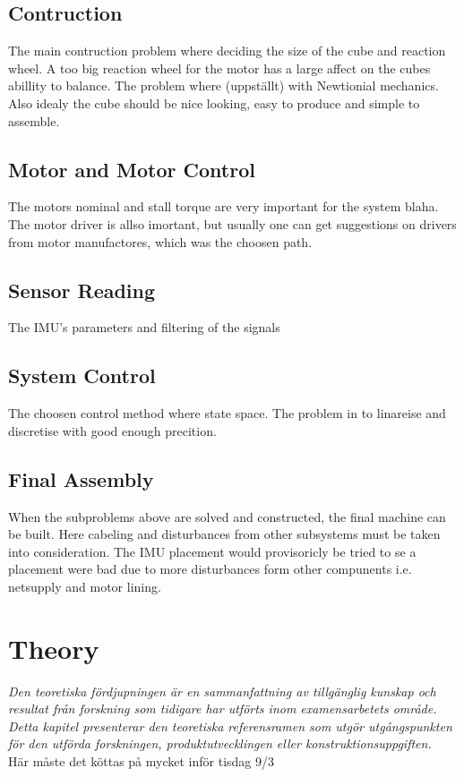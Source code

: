 \documentclass[a4paper,11pt]{kth-mag}
\begin{document}
\section{Contruction}
The main contruction problem where deciding the size of the cube and reaction wheel. A too big reaction wheel for the motor has a large affect on the cubes abillity to balance. The problem where (uppställt) with Newtionial mechanics.
Also idealy the cube should be nice looking, easy to produce and simple to assemble. 
 
\section{Motor and Motor Control}
The motors nominal and stall torque are very important for the system blaha. The motor driver is allso imortant, but usually one can get suggestions on drivers from motor manufactores, which was the choosen path.
  
\section{Sensor Reading}
The IMU's parameters and filtering of the signals

\section{System Control}
The choosen control method where state space. The problem in to linareise and discretise with good enough precition.

\section{Final Assembly}
When the subproblems above are solved and constructed, the final machine can be built. Here cabeling and disturbances from other subsystems must be taken into consideration. 
The IMU placement would provisoricly be tried to se a placement were bad due to more disturbances form other compunents i.e. netsupply and motor lining.

\chapter{Theory}
\emph{Den teoretiska fördjupningen är en sammanfattning av tillgänglig kunskap och resultat från forskning som tidigare har utförts inom examensarbetets område. Detta kapitel presenterar den teoretiska referensramen som utgör utgångspunkten för den utförda forskningen, produktutvecklingen eller konstruktionsuppgiften.}
\\ Här måste det köttas på mycket inför tisdag 9/3 \\
\end{document}
